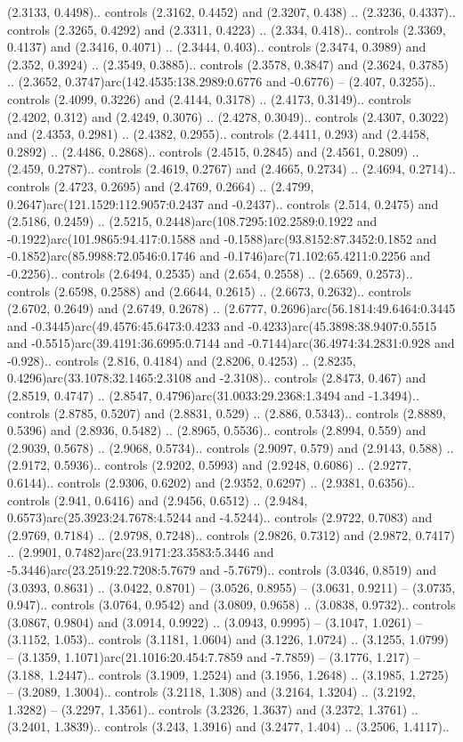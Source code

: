 (2.3133, 0.4498).. controls (2.3162, 0.4452) and (2.3207, 0.438) .. (2.3236, 0.4337).. controls (2.3265, 0.4292) and (2.3311, 0.4223) .. (2.334, 0.418).. controls (2.3369, 0.4137) and (2.3416, 0.4071) .. (2.3444, 0.403).. controls (2.3474, 0.3989) and (2.352, 0.3924) .. (2.3549, 0.3885).. controls (2.3578, 0.3847) and (2.3624, 0.3785) .. (2.3652, 0.3747)arc(142.4535:138.2989:0.6776 and -0.6776) -- (2.407, 0.3255).. controls (2.4099, 0.3226) and (2.4144, 0.3178) .. (2.4173, 0.3149).. controls (2.4202, 0.312) and (2.4249, 0.3076) .. (2.4278, 0.3049).. controls (2.4307, 0.3022) and (2.4353, 0.2981) .. (2.4382, 0.2955).. controls (2.4411, 0.293) and (2.4458, 0.2892) .. (2.4486, 0.2868).. controls (2.4515, 0.2845) and (2.4561, 0.2809) .. (2.459, 0.2787).. controls (2.4619, 0.2767) and (2.4665, 0.2734) .. (2.4694, 0.2714).. controls (2.4723, 0.2695) and (2.4769, 0.2664) .. (2.4799, 0.2647)arc(121.1529:112.9057:0.2437 and -0.2437).. controls (2.514, 0.2475) and (2.5186, 0.2459) .. (2.5215, 0.2448)arc(108.7295:102.2589:0.1922 and -0.1922)arc(101.9865:94.417:0.1588 and -0.1588)arc(93.8152:87.3452:0.1852 and -0.1852)arc(85.9988:72.0546:0.1746 and -0.1746)arc(71.102:65.4211:0.2256 and -0.2256).. controls (2.6494, 0.2535) and (2.654, 0.2558) .. (2.6569, 0.2573).. controls (2.6598, 0.2588) and (2.6644, 0.2615) .. (2.6673, 0.2632).. controls (2.6702, 0.2649) and (2.6749, 0.2678) .. (2.6777, 0.2696)arc(56.1814:49.6464:0.3445 and -0.3445)arc(49.4576:45.6473:0.4233 and -0.4233)arc(45.3898:38.9407:0.5515 and -0.5515)arc(39.4191:36.6995:0.7144 and -0.7144)arc(36.4974:34.2831:0.928 and -0.928).. controls (2.816, 0.4184) and (2.8206, 0.4253) .. (2.8235, 0.4296)arc(33.1078:32.1465:2.3108 and -2.3108).. controls (2.8473, 0.467) and (2.8519, 0.4747) .. (2.8547, 0.4796)arc(31.0033:29.2368:1.3494 and -1.3494).. controls (2.8785, 0.5207) and (2.8831, 0.529) .. (2.886, 0.5343).. controls (2.8889, 0.5396) and (2.8936, 0.5482) .. (2.8965, 0.5536).. controls (2.8994, 0.559) and (2.9039, 0.5678) .. (2.9068, 0.5734).. controls (2.9097, 0.579) and (2.9143, 0.588) .. (2.9172, 0.5936).. controls (2.9202, 0.5993) and (2.9248, 0.6086) .. (2.9277, 0.6144).. controls (2.9306, 0.6202) and (2.9352, 0.6297) .. (2.9381, 0.6356).. controls (2.941, 0.6416) and (2.9456, 0.6512) .. (2.9484, 0.6573)arc(25.3923:24.7678:4.5244 and -4.5244).. controls (2.9722, 0.7083) and (2.9769, 0.7184) .. (2.9798, 0.7248).. controls (2.9826, 0.7312) and (2.9872, 0.7417) .. (2.9901, 0.7482)arc(23.9171:23.3583:5.3446 and -5.3446)arc(23.2519:22.7208:5.7679 and -5.7679).. controls (3.0346, 0.8519) and (3.0393, 0.8631) .. (3.0422, 0.8701) -- (3.0526, 0.8955) -- (3.0631, 0.9211) -- (3.0735, 0.947).. controls (3.0764, 0.9542) and (3.0809, 0.9658) .. (3.0838, 0.9732).. controls (3.0867, 0.9804) and (3.0914, 0.9922) .. (3.0943, 0.9995) -- (3.1047, 1.0261) -- (3.1152, 1.053).. controls (3.1181, 1.0604) and (3.1226, 1.0724) .. (3.1255, 1.0799) -- (3.1359, 1.1071)arc(21.1016:20.454:7.7859 and -7.7859) -- (3.1776, 1.217) -- (3.188, 1.2447).. controls (3.1909, 1.2524) and (3.1956, 1.2648) .. (3.1985, 1.2725) -- (3.2089, 1.3004).. controls (3.2118, 1.308) and (3.2164, 1.3204) .. (3.2192, 1.3282) -- (3.2297, 1.3561).. controls (3.2326, 1.3637) and (3.2372, 1.3761) .. (3.2401, 1.3839).. controls (3.243, 1.3916) and (3.2477, 1.404) .. (3.2506, 1.4117).. 